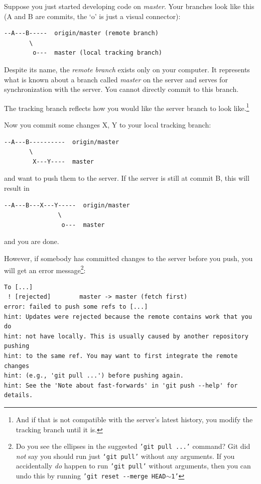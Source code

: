 \documentclass[12pt,pdftex]{article}
\begin{document}
Suppose you just started developing code on \emph{master}.
Your branches look like this (A and B are commits, the `o' is just
a visual connector):
\begin{verbatim}
--A---B-----  origin/master (remote branch)
       \
        o---  master (local tracking branch)
\end{verbatim}


\bigskip

Despite its name, the \emph{remote branch} exists only on your computer.
It represents what is known about a branch called \emph{master} on the
server and serves for synchronization with the server.
You cannot directly commit to this branch.

The tracking branch reflects how you would like the server branch to
look like.\footnote{And if that is not compatible with the server's latest history, you
modify the tracking branch until it is.}


\bigskip


Now you commit some changes X, Y to your local tracking branch:
\begin{verbatim}
--A---B----------  origin/master
       \
        X---Y----  master
\end{verbatim}
and want to push them to the server.
If the server is still at commit B, this will result in
\begin{verbatim}
--A---B---X---Y-----  origin/master
               \
                o---  master
\end{verbatim}
and you are done.

However, if somebody has committed changes to the server before you
push, you will get an error message\footnote{Do you see the ellipses in the
suggested \texttt{'git pull ...'} command? Git did \emph{not} say you should
run just \texttt{‘git pull’} without any arguments. If you accidentally
\emph{do} happen to run \texttt{'git pull'} without arguments, then you can
undo this by running \texttt{'git reset -{}-merge HEAD$\sim$1'}}:

{\small
\begin{verbatim}
To [...]
 ! [rejected]        master -> master (fetch first)
error: failed to push some refs to [...]
hint: Updates were rejected because the remote contains work that you do
hint: not have locally. This is usually caused by another repository pushing
hint: to the same ref. You may want to first integrate the remote changes
hint: (e.g., 'git pull ...') before pushing again.
hint: See the 'Note about fast-forwards' in 'git push --help' for details.
\end{verbatim}
}
\end{document}
